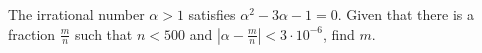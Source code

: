 The irrational number $\alpha>1$ satisfies $\alpha^2-3\alpha-1=0$. Given that there is a fraction $\frac{m}{n}$ such that $n<500$ and $\left|\alpha-\frac{m}{n}\right|<3\cdot10^{-6}$, find $m$.